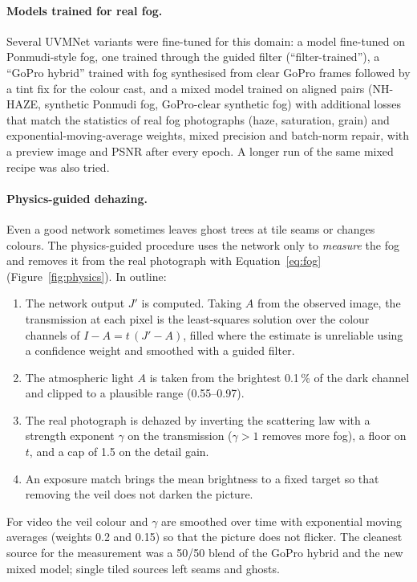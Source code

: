 \paragraph{Models trained for real fog.} Several UVMNet variants were fine-tuned
for this domain: a model fine-tuned on Ponmudi-style fog, one trained through the
guided filter (``filter-trained''), a ``GoPro hybrid'' trained with fog synthesised
from clear GoPro frames followed by a tint fix for the colour cast, and a
mixed model trained on aligned pairs (NH-HAZE, synthetic Ponmudi fog, GoPro-clear
synthetic fog) with additional losses that match the statistics of real fog
photographs (haze, saturation, grain) and exponential-moving-average weights,
mixed precision and batch-norm repair, with a preview image and PSNR after every
epoch. A longer run of the same mixed recipe was also tried.

\paragraph{Physics-guided dehazing.} Even a good network sometimes leaves ghost
trees at tile seams or changes colours. The physics-guided procedure uses the
network only to \emph{measure} the fog and removes it from the real photograph
with Equation~\eqref{eq:fog} (Figure~\ref{fig:physics}). In outline:
\begin{enumerate}
  \item The network output $J'$ is computed. Taking $A$ from the observed
        image, the transmission at each pixel is the least-squares solution over
        the colour channels of $I-A = t\,(J'-A)$, filled where the estimate is
        unreliable using a confidence weight and smoothed with a guided
        filter.
  \item The atmospheric light $A$ is taken from the brightest 0.1\,\% of the
        dark channel and clipped to a plausible range (0.55--0.97).
  \item The real photograph is dehazed by inverting the scattering law with a
        strength exponent $\gamma$ on the transmission ($\gamma>1$ removes
        more fog), a floor on $t$, and a cap of 1.5 on the detail gain.
  \item An exposure match brings the mean brightness to a fixed target so that
        removing the veil does not darken the picture.
\end{enumerate}
For video the veil colour and $\gamma$ are smoothed over time with exponential
moving averages (weights 0.2 and 0.15) so that the picture does not flicker.
The cleanest source for the measurement was a 50/50 blend of the GoPro hybrid
and the new mixed model; single tiled sources left seams and ghosts.

